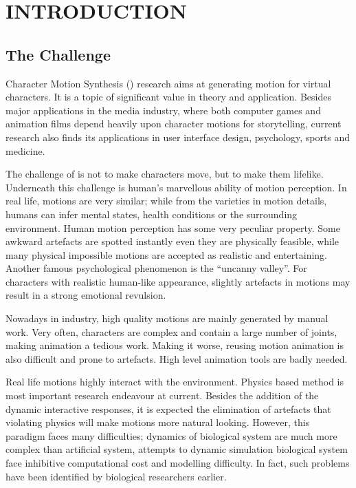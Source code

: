 \chapter{INTRODUCTION}
\label{chap:intro}

\graphicspath{{Introduction/IntroductionFigs/EPS/}{Introduction/IntroductionFigs/}}

\section{The Challenge}
Character Motion Synthesis (\cms) research aims at generating motion for virtual characters.
It is a topic of significant value in theory and application. 
Besides major applications in the media industry, where both computer games and animation films depend heavily upon character motions for storytelling, 
current research also finds its applications in user interface design, psychology, sports and medicine.

The challenge of \cms  is not to make characters move, but  to make them lifelike. 
Underneath this challenge is human's marvellous ability of motion perception. 
In real life, motions are very similar; 
while from the varieties in motion details, humans can infer mental states, health conditions or the surrounding environment.
Human motion perception has some very peculiar property.
Some awkward artefacts are spotted instantly even they are physically feasible, while many physical impossible motions are accepted as realistic and entertaining. 
Another famous psychological phenomenon is the ``uncanny valley''.
For characters with realistic human-like appearance, slightly artefacts in motions may result in a strong emotional revulsion.



Nowadays in industry, high quality motions are mainly generated by manual work. 
Very often, characters are complex and contain a large number of joints, making animation a tedious work.
Making it worse, reusing motion animation is also difficult and prone to artefacts.
High level animation tools are badly needed. 



Real life motions highly interact with the environment.
Physics based method  is most important research endeavour at current.
Besides  the addition of the dynamic interactive responses, it is  expected  the elimination of  artefacts that violating physics  will make motions more natural looking.
However, this paradigm faces many difficulties; dynamics of biological system are much more complex than artificial system,  attempts to dynamic simulation biological system face inhibitive  computational cost and modelling difficulty.
In fact, such problems have been identified by biological researchers earlier.







